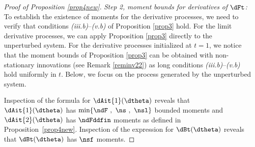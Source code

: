 \begin{proof}[Proof of Proposition \ref{prop4new}]
\smallskip
\textit{Step 2, moment bounds for derivatives of $\dFt$:}
To establish the existence of moments for the derivative processes,
we need to verify that conditions \textit{(iii.b)}--\textit{(v.b)} of Proposition \ref{prop3} hold. For the limit derivative processes, we can apply Proposition \ref{prop3} directly to the unperturbed system. For the derivative processes initialized at $t=1$, we notice that the moment bounds of Proposition \ref{prop3} can be obtained with non-stationary innovations (see Remark \ref{reminv22}) as long conditions \textit{(iii.b)}--\textit{(v.b)} hold uniformly in $t$. Below, we focus on the process generated by the unperturbed system.


Inspection of the formula for  $\dAit{1}(\dtheta)$ reveals that $\dAit{1}(\dtheta)$  has  $\min \{\ndF\ ,\  \ns \ , \  \nsl \}$ 
bounded moments and $\dAit{2}(\dtheta)$ has  $\ndFddfin$
moments as defined in Proposition~\ref{prop4new}. Inspection of the expression for $\dBt(\dtheta)$ reveals that $\dBt(\dtheta)$ has 
$\nsf$
moments. 


\end{proof}
